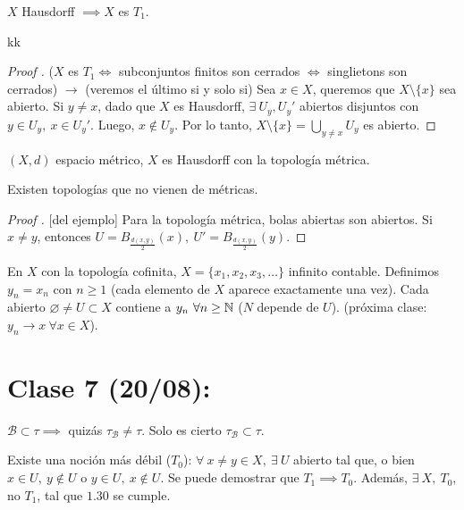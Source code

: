 \documentclass[a4paper]{report}
\begin{document}
	\begin{lemma}
		$X$ Hausdorff $\implies X$ es $T_1$.
	\end{lemma}
kk
	\begin{proof}[Proof ]
		($X$ es $T_1 \iff$ subconjuntos finitos son cerrados $\iff$ singlietons son cerrados) $\rightarrow$ (veremos el último si y solo si) Sea $x \in X$, queremos que $X \setminus \{x\}$ sea abierto. Si $y \neq x$, dado que $X$ es Hausdorff, $\exists\ U_y, U_y'$ abiertos disjuntos con $y \in U_y,\ x \in U_y'$. Luego, $x \not\in U_y$. Por lo tanto, $X \setminus \{ x \} = \displaystyle\bigcup_{y \neq x} U_y$ es abierto.
	\end{proof}

	\begin{eg}
		$(X,d)$ espacio métrico, $X$ es Hausdorff con la topología métrica.
	\end{eg}

	\begin{corollary}[secreto]
		Existen topologías que no vienen de métricas.
	\end{corollary}

	\begin{proof}[Proof ][del ejemplo]
		Para la topología métrica, bolas abiertas son abiertos. Si $x \neq y$, entonces $U = B_{\frac{d(x,y)}{2}}(x),\ U' = B_{\frac{d(x,y)}{2}}(y)$.
	\end{proof}

	En $X$ con la topología cofinita, $X = \{ x_1, x_2, x_3,\dots \}$ infinito contable. Definimos $y_n = x_n$ con $n \geq 1$ (cada elemento de $X$ aparece exactamente una vez). Cada abierto $\varnothing \neq U \subset X$ contiene a $y_n \ \forall n \geq \mathbb{N}$ ($N$ depende de $U$). (próxima clase: $y_n \to x \ \forall x \in X$). 
	

	\section{Clase 7 (20/08): }

	\begin{remark}
		$\mathcal{B} \subset \tau \implies$ quizás $\tau_{\mathcal{B}} \neq \tau$. Solo es cierto $\tau_{\mathcal{B}} \subset \tau$.
	\end{remark}

	\begin{remark}
		Existe una noción más débil ($T_0$): $\forall \ x \neq y \in X,\ \exists \ U$ abierto tal que, o bien $x \in U,\ y \not\in U$ o $y \in U,\ x \not\in U$. Se puede demostrar que $T_1 \implies T_0$. Además, $\exists\ X,\ T_0$, no $T_1$, tal que $1.30$ se cumple.
	\end{remark}
\end{document}
